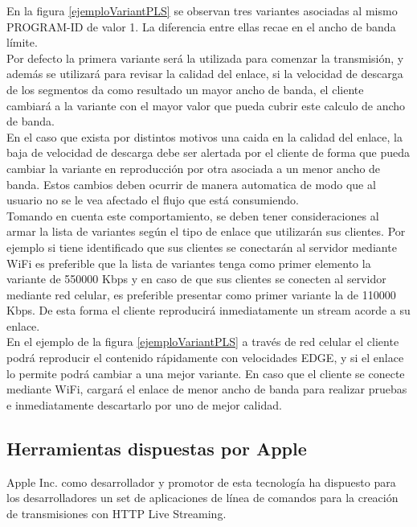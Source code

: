 En la figura \ref{ejemploVariantPLS} se observan tres variantes asociadas al mismo PROGRAM-ID de valor 1. La diferencia entre ellas recae en el ancho de banda límite.\\

Por defecto la primera variante será la utilizada para comenzar la transmisión, y además se utilizará para revisar la calidad del enlace, si la velocidad de descarga de los segmentos da como resultado un mayor ancho de banda, el cliente cambiará a la variante con el mayor valor que pueda cubrir este calculo de ancho de banda.\\

En el caso que exista por distintos motivos una caida en la calidad del enlace, la baja de velocidad de descarga debe ser alertada por el cliente de forma que pueda cambiar la variante en reproducción por otra asociada a un menor ancho de banda. Estos cambios deben ocurrir de manera automatica de modo que al usuario no se le vea afectado el flujo que está consumiendo.\\

Tomando en cuenta este comportamiento, se deben tener consideraciones al armar la lista de variantes según el tipo de enlace que utilizarán sus clientes. Por ejemplo si tiene identificado que sus clientes se conectarán al servidor mediante WiFi es preferible que la lista de variantes tenga como primer elemento la variante de 550000 Kbps y en caso de que sus clientes se conecten al servidor mediante red celular, es preferible presentar como primer variante la de 110000 Kbps.
	De esta forma el cliente reproducirá inmediatamente un stream acorde a su enlace. \\
	
En el ejemplo de la figura \ref{ejemploVariantPLS} a través de red celular el cliente podrá reproducir el contenido rápidamente con velocidades EDGE, y si el enlace lo permite podrá cambiar a una mejor variante. En caso que el cliente se conecte mediante WiFi, cargará el enlace de menor ancho de banda para realizar pruebas e inmediatamente descartarlo por uno de mejor calidad.




	\subsection{Herramientas dispuestas por Apple}
	Apple Inc. como desarrollador y promotor de esta tecnología ha dispuesto para los desarrolladores un set de aplicaciones de línea de comandos para la creación de transmisiones con HTTP Live Streaming.
